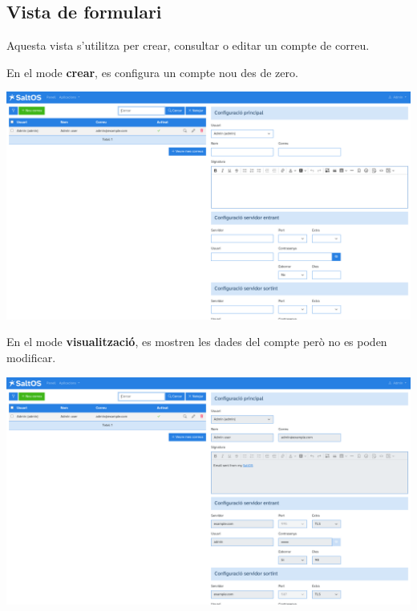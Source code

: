\documentclass[a4paper]{article}
\begin{document}
\hypertarget{toc99}{}
\subsection{Vista de formulari}

Aquesta vista s'utilitza per crear, consultar o editar un compte de correu.

En el mode \textbf{crear}, es configura un compte nou des de zero.

\begin{center}\includegraphics[width=1\textwidth]{../ujest/snaps/test-screenshots-js-screenshots-emails-emails-accounts-create-ca-es-1-snap.png}\end{center}

En el mode \textbf{visualització}, es mostren les dades del compte però no es poden modificar.

\begin{center}\includegraphics[width=1\textwidth]{../ujest/snaps/test-screenshots-js-screenshots-emails-emails-accounts-view-1-ca-es-1-snap.png}\end{center}
\end{document}

